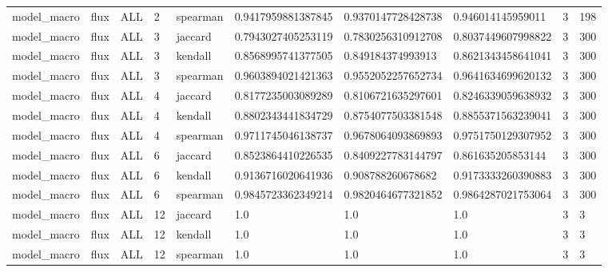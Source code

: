 \begin{tabular}{llllllllll}
model\_macro & flux & ALL & 2 & spearman & 0.9417959881387845 & 0.9370147728428738 & 0.946014145959011 & 3 & 198 \\
model\_macro & flux & ALL & 3 & jaccard & 0.7943027405253119 & 0.7830256310912708 & 0.8037449607998822 & 3 & 300 \\
model\_macro & flux & ALL & 3 & kendall & 0.8568995741377505 & 0.849184374993913 & 0.8621343458641041 & 3 & 300 \\
model\_macro & flux & ALL & 3 & spearman & 0.9603894021421363 & 0.9552052257652734 & 0.9641634699620132 & 3 & 300 \\
model\_macro & flux & ALL & 4 & jaccard & 0.8177235003089289 & 0.8106721635297601 & 0.8246339059638932 & 3 & 300 \\
model\_macro & flux & ALL & 4 & kendall & 0.8802343441834729 & 0.8754077503381548 & 0.8855371563239041 & 3 & 300 \\
model\_macro & flux & ALL & 4 & spearman & 0.9711745046138737 & 0.9678064093869893 & 0.9751750129307952 & 3 & 300 \\
model\_macro & flux & ALL & 6 & jaccard & 0.8523864410226535 & 0.8409227783144797 & 0.861635205853144 & 3 & 300 \\
model\_macro & flux & ALL & 6 & kendall & 0.9136716020641936 & 0.908788260678682 & 0.9173333260390883 & 3 & 300 \\
model\_macro & flux & ALL & 6 & spearman & 0.9845723362349214 & 0.9820464677321852 & 0.9864287021753064 & 3 & 300 \\
model\_macro & flux & ALL & 12 & jaccard & 1.0 & 1.0 & 1.0 & 3 & 3 \\
model\_macro & flux & ALL & 12 & kendall & 1.0 & 1.0 & 1.0 & 3 & 3 \\
model\_macro & flux & ALL & 12 & spearman & 1.0 & 1.0 & 1.0 & 3 & 3 \\
 \bottomrule
\end{tabular}
